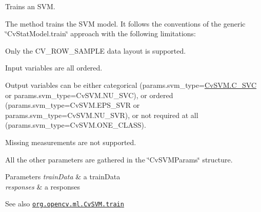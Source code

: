 Trains an S\+VM.

The method trains the S\+VM model. It follows the conventions of the generic \char`\"{}\+Cv\+Stat\+Model.\+train\char`\"{} approach with the following limitations\+:


\begin{DoxyItemize}
\item Only the {\ttfamily C\+V\+\_\+\+R\+O\+W\+\_\+\+S\+A\+M\+P\+LE} data layout is supported. 
\item Input variables are all ordered. 
\item Output variables can be either categorical ({\ttfamily params.\+svm\+\_\+type=\mbox{\hyperlink{classorg_1_1opencv_1_1ml_1_1_cv_s_v_m_a8f904304af3689654b3d7de34ae54801}{Cv\+S\+V\+M.\+C\+\_\+\+S\+VC}}} or {\ttfamily params.\+svm\+\_\+type=Cv\+S\+V\+M.\+N\+U\+\_\+\+S\+VC}), or ordered ({\ttfamily params.\+svm\+\_\+type=Cv\+S\+V\+M.\+E\+P\+S\+\_\+\+S\+VR} or {\ttfamily params.\+svm\+\_\+type=Cv\+S\+V\+M.\+N\+U\+\_\+\+S\+VR}), or not required at all ({\ttfamily params.\+svm\+\_\+type=Cv\+S\+V\+M.\+O\+N\+E\+\_\+\+C\+L\+A\+SS}). 
\item Missing measurements are not supported. 
\end{DoxyItemize}

All the other parameters are gathered in the \char`\"{}\+Cv\+S\+V\+M\+Params\char`\"{} structure.


\begin{DoxyParams}{Parameters}
{\em train\+Data} & a train\+Data \\
\hline
{\em responses} & a responses\\
\hline
\end{DoxyParams}
\begin{DoxySeeAlso}{See also}
\href{http://docs.opencv.org/modules/ml/doc/support_vector_machines.html#cvsvm-train}{\tt org.\+opencv.\+ml.\+Cv\+S\+V\+M.\+train} 
\end{DoxySeeAlso}
\mbox{\label{classorg_1_1opencv_1_1ml_1_1_cv_s_v_m_a08af9eb5976bbf6d2fdc994a9a5554d0}} 
